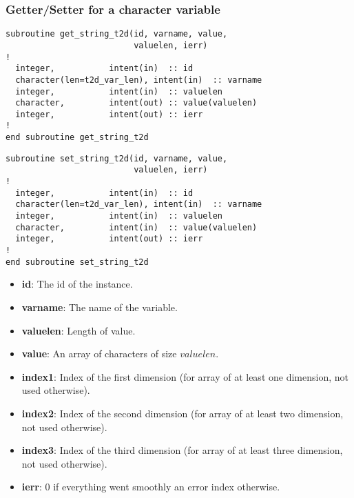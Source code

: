 \subsubsection{Getter/Setter for a character variable}
%
\begin{lstlisting}
subroutine get_string_t2d(id, varname, value, 
                          valuelen, ierr)
!
  integer,           intent(in)  :: id
  character(len=t2d_var_len), intent(in)  :: varname
  integer,           intent(in)  :: valuelen
  character,         intent(out) :: value(valuelen)
  integer,           intent(out) :: ierr
!
end subroutine get_string_t2d
\end{lstlisting}

\begin{lstlisting}
subroutine set_string_t2d(id, varname, value, 
                          valuelen, ierr)
!
  integer,           intent(in)  :: id
  character(len=t2d_var_len), intent(in)  :: varname
  integer,           intent(in)  :: valuelen
  character,         intent(in)  :: value(valuelen)
  integer,           intent(out) :: ierr
!
end subroutine set_string_t2d
\end{lstlisting}
\begin{itemize}
\item \textbf{id}: The id of the instance.
\item \textbf{varname}: The name of the variable.
\item \textbf{valuelen}: Length of value.
\item \textbf{value}: An array of characters of size $valuelen$.
\item \textbf{index1}: Index of the first dimension (for array of at least one
dimension, not used otherwise).
\item \textbf{index2}: Index of the second dimension (for array of at least two
dimension, not used otherwise).
\item \textbf{index3}: Index of the third dimension (for array of at least
three dimension, not used otherwise).
\item \textbf{ierr}: 0 if everything went smoothly an error index otherwise.
\end{itemize}

%
